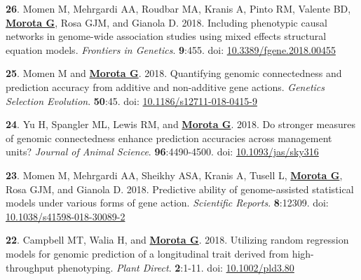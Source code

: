 \documentclass[margin,line,10pt]{res}
\newenvironment{list1}{
  \begin{list}{\ding{113}}{%
      \setlength{\itemsep}{0in}
      \setlength{\parsep}{0in} \setlength{\parskip}{0in}
      \setlength{\topsep}{0in} \setlength{\partopsep}{0in} 
      \setlength{\leftmargin}{0.17in}}}{\end{list}}
\begin{document}
\begin{resume}
\begin{list1}
   \vspace{0.5cm}
  
\item  [{\bf 26}.] Momen M, Mehrgardi AA, Roudbar MA, Kranis A, Pinto RM, Valente BD, \textbf{\underline{Morota G}}, Rosa GJM, and Gianola D. 2018. Including phenotypic causal networks in genome-wide association studies using mixed effects structural equation models. \emph{Frontiers in Genetics}. \textbf{9}:455. doi: \textcolor{blue}{\href{https://doi.org/10.3389/fgene.2018.00455}{10.3389/fgene.2018.00455}}

  \vspace{0.5cm}
  
\item  [{\bf 25}.] Momen M and  \textbf{\underline{Morota G}}. 2018. Quantifying genomic connectedness and prediction accuracy from additive and non-additive gene actions. \emph{Genetics Selection Evolution}. \textbf{50}:45. doi: \textcolor{blue}{\href{https://doi.org/10.1186/s12711-018-0415-9}{10.1186/s12711-018-0415-9}}

  \vspace{0.5cm}
  
\item  [{\bf 24}.] Yu H, Spangler ML, Lewis RM, and {\bf \underline{Morota G}}. 2018.  Do stronger measures of genomic connectedness enhance prediction accuracies across management units? \emph{Journal of Animal Science}. \textbf{96}:4490-4500.  doi: \textcolor{blue}{\href{https://doi.org/10.1093/jas/sky316}{10.1093/jas/sky316}} 

  \vspace{0.5cm}

\item  [{\bf 23}.] Momen M, Mehrgardi AA, Sheikhy ASA, Kranis A, Tusell L, \textbf{\underline{Morota G}}, Rosa GJM, and Gianola D. 2018. Predictive ability of genome-assisted statistical models under various forms of gene action. \emph{Scientific Reports}. \textbf{8}:12309. doi: \textcolor{blue}{\href{https://doi.org/10.1038/s41598-018-30089-2}{10.1038/s41598-018-30089-2}} 

  \vspace{0.5cm}

\item [{\bf 22}.] Campbell MT, Walia H, and \textbf{\underline{Morota G}}. 2018. Utilizing random regression models for genomic prediction of a longitudinal trait derived from high-throughput phenotyping. \emph{Plant Direct}. \textbf{2}:1-11. doi: \textcolor{blue}{\href{https://doi.org/10.1002/pld3.80}{10.1002/pld3.80}} 
  

\end{list1}
\end{resume}
\end{document}
